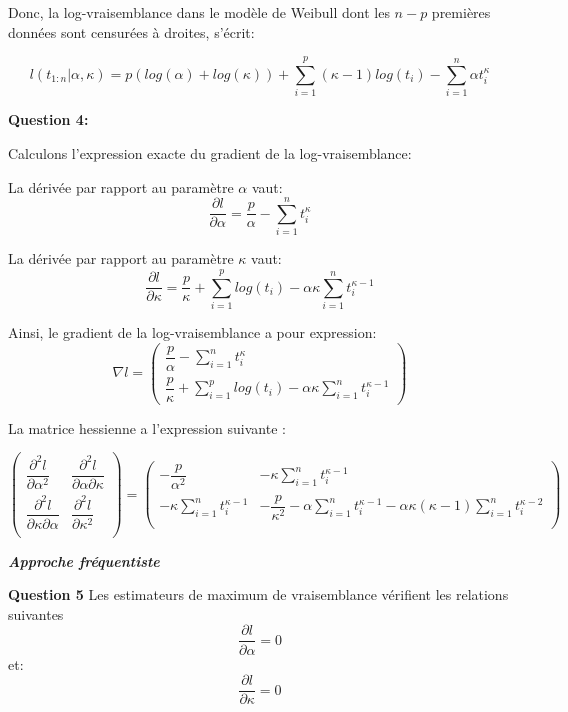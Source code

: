 \documentclass[
]{article}
\begin{document}
Donc, la log-vraisemblance dans le modèle de Weibull dont les \(n-p\)
premières données sont censurées à droites, s'écrit:

\[l(t_{1:n}| \alpha,\kappa) = p(log(\alpha) + log(\kappa)) +\sum_{i = 1}^{p} (\kappa-1)log(t_i) -\sum_{i = 1}^{n} \alpha t_{i}^{\kappa}\]

\textbf{Question 4:}

Calculons l'expression exacte du gradient de la log-vraisemblance:

La dérivée par rapport au paramètre \(\alpha\) vaut:
\[\dfrac{\partial l}{\partial \alpha} = \dfrac{p}{\alpha} - \sum_{i = 1}^{n} t_{i}^{\kappa}\]

La dérivée par rapport au paramètre \(\kappa\) vaut:
\[\dfrac{\partial l}{\partial \kappa} = \dfrac{p}{\kappa} +\sum_{i = 1}^{p}log(t_{i}) - \alpha\kappa\sum_{i = 1}^{n}t_{i}^{\kappa-1}\]

Ainsi, le gradient de la log-vraisemblance a pour expression:
\[\nabla l=\begin{pmatrix}
\dfrac{p}{\alpha} - \sum_{i = 1}^{n} t_{i}^{\kappa}\\
\dfrac{p}{\kappa} +\sum_{i = 1}^{p}log(t_{i}) - \alpha\kappa\sum_{i = 1}^{n}t_{i}^{\kappa-1}
\end{pmatrix}\]

La matrice hessienne a l'expression suivante :

\[\begin{pmatrix}
\dfrac{\partial ^{2}l}{\partial \alpha^{2}} & \dfrac{\partial^{2} l}{\partial\alpha\partial\kappa} \\ \dfrac{\partial^{2} l}{\partial\kappa\partial\alpha}
 & \dfrac{\partial ^{2}l}{\partial \kappa^{2}} \\
\end{pmatrix} = \begin{pmatrix} -\dfrac{p}{\alpha^{2}} & - \kappa\sum_{i = 1}^{n}t_{i}^{\kappa-1} \\ -\kappa \sum_{i = 1}^{n}t_{i}^{\kappa-1} & -\dfrac{p}{\kappa^{2}} -\alpha\sum_{i = 1}^{n}t_{i}^{\kappa-1} - \alpha \kappa (\kappa-1)\sum_{i = 1}^{n}t_{i}^{\kappa-2}   \\\end{pmatrix}\]

\textbf{\emph{Approche fréquentiste}}

\textbf{Question 5} Les estimateurs de maximum de vraisemblance
vérifient les relations suivantes
\[\dfrac{\partial l}{\partial \alpha} = 0\] et:
\[\dfrac{\partial l}{\partial \kappa} = 0\]
\end{document}
